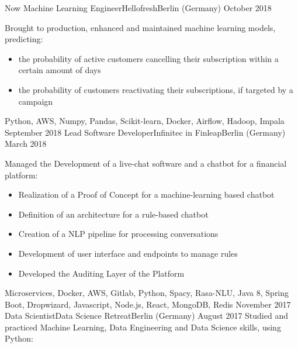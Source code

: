 %
%
%
\begin{experiences}
 \experience
    {Now}       {Machine Learning Engineer}{Hellofresh}{Berlin (Germany)}
    {October 2018}  {Brought to production, enhanced and maintained machine learning models, predicting: 
                      \begin{itemize}
                      \item the probability of active customers cancelling their subscription within a certain amount of days
					  \item the probability of customers reactivating their subscriptions, if targeted by a campaign  
                      \end{itemize}
                    }
                    {Python, AWS, Numpy, Pandas, Scikit-learn, Docker, Airflow, Hadoop, Impala}
  \emptySeparator
  \experience
    {September 2018}       {Lead Software Developer}{Infinitec in Finleap}{Berlin (Germany)}
    {March 2018}  {Managed the Development of a live-chat software and a chatbot for a financial platform: 
                      \begin{itemize}
                      \item Realization of a Proof of Concept for a machine-learning based chatbot
					  \item Definition of an architecture for a rule-based chatbot	
                      \item Creation of a NLP pipeline for processing conversations 
                      \item Development of user interface and endpoints to manage rules
    				  \item Developed the Auditing Layer of the Platform
                      \end{itemize}
                    }
                    {Microservices, Docker, AWS, Gitlab, Python, Spacy, Rasa-NLU, Java 8, Spring Boot, Dropwizard, Javascript, Node.js, React, MongoDB, Redis}
  \emptySeparator
  \experience
    {November 2017}   {Data Scientist}{Data Science Retreat}{Berlin (Germany)}
    {August 2017}  {Studied and practiced Machine Learning, Data Engineering and Data Science skills, using Python: 
}
\end{experiences}
